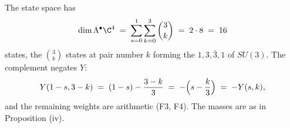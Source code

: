 The state space has
\[
\dim \Lambda^{\bullet}\C^{4} \;=\; \sum_{s=0}^{1}\sum_{k=0}^{3}\binom{3}{k} \;=\; 2 \cdot 8 \;=\; 16
\]
states, the $\binom{3}{k}$ states at pair number $k$ forming the $1, 3, \bar{3}, 1$ of $SU(3)$. The complement negates $Y$:
\[
Y(1 - s, 3 - k) \;=\; (1 - s) - \frac{3 - k}{3} \;=\; -\Bigl(s - \frac{k}{3}\Bigr) \;=\; -Y(s, k),
\]
and the remaining weights are arithmetic (F3, F4). The masses are as in Proposition (iv).
